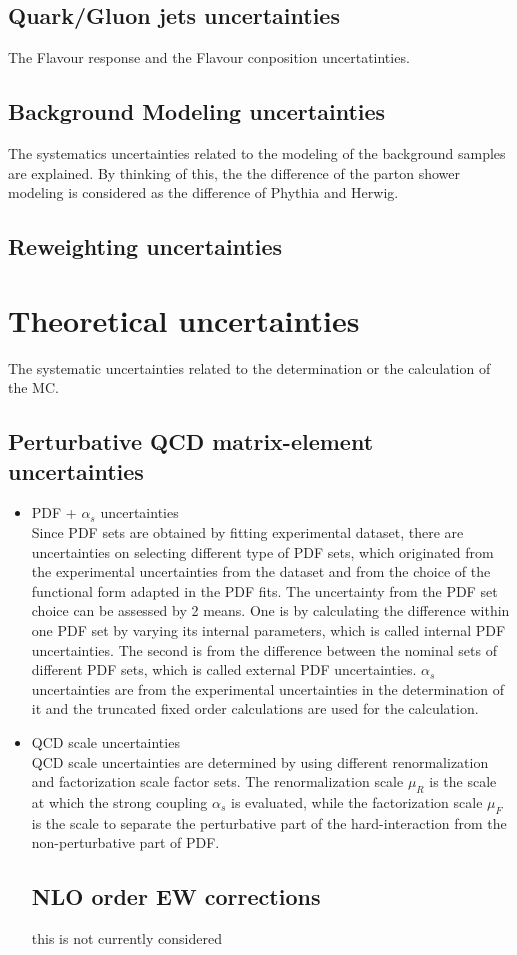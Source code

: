 \subsection{Quark/Gluon jets uncertainties}
The Flavour response and the Flavour conposition uncertatinties.
\subsection{Background Modeling uncertainties}
The systematics uncertainties related to the modeling of the background samples are explained.
By thinking of this, the the difference of the parton shower modeling is considered as the difference of Phythia and Herwig.
\subsection{Reweighting uncertainties}

\section{Theoretical uncertainties}
The systematic uncertainties related to the determination or the calculation of the MC.

\subsection{Perturbative QCD matrix-element uncertainties}
\begin{itemize}
\item PDF + $\alpha_s$ uncertainties\\
Since PDF sets are obtained by fitting experimental dataset, there are uncertainties on selecting different type of PDF sets, which originated from the experimental uncertainties from the dataset and from the choice of the functional form adapted in the PDF fits.
The uncertainty from the PDF set choice can be assessed by 2 means. One is by calculating the difference within one PDF set by varying its internal parameters, which is called internal PDF uncertainties. The second is from the difference between the nominal sets of different PDF sets, which is called external PDF uncertainties.
$\alpha_s$ uncertainties are from the experimental uncertainties in the determination of it and the truncated fixed order calculations are used for the calculation.
\item QCD scale uncertainties\\
QCD scale uncertainties are determined by using different renormalization and factorization scale factor sets. 
The renormalization scale $\mu_R$ is the scale at which the strong coupling $\alpha_s$ is evaluated, while the factorization scale $\mu_F$ is the scale to separate the perturbative part of the hard-interaction from the non-perturbative part of PDF. 


\subsection{NLO order EW corrections}
\color{blue}
this is not currently considered
\end{itemize}


